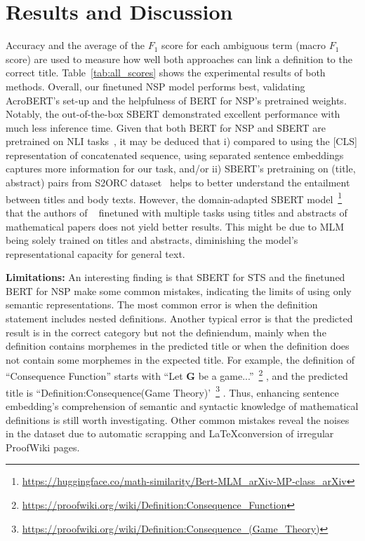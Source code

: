 \section{Results and Discussion}
\label{sec:experiments}
Accuracy and the average of the $F_1$ score for each ambiguous term (macro $F_1$ score) are used to measure how well both approaches can link a definition to the correct title. Table~\ref{tab:all_scores} shows the experimental results of both methods. Overall, our finetuned NSP model performs best, validating AcroBERT's set-up and the helpfulness of BERT for NSP's pretrained weights. Notably, the out-of-the-box SBERT demonstrated excellent performance with much less inference time.
Given that both BERT for NSP and SBERT are pretrained on NLI tasks~\cite{devlin2019bert,reimers2019sentence}, it may be deduced that i) compared to using the [CLS] representation of concatenated sequence, using separated sentence embeddings captures more information for our task, and/or ii) SBERT's pretraining on (title, abstract) pairs from S2ORC dataset~\cite{lo-wang-2020-s2orc} helps to better understand the entailment between titles and body texts. However, 
the domain-adapted SBERT model~\footnote{\url{https://huggingface.co/math-similarity/Bert-MLM_arXiv-MP-class_arXiv}}  that the authors of ~\cite{steinfeldt2024evaluation} finetuned with multiple tasks using titles and abstracts of mathematical papers does not yield better results. This might be due to MLM being solely trained on titles and abstracts, diminishing the model's representational capacity for general text. 

\textbf{Limitations:} An interesting finding %
is that SBERT for STS and the finetuned BERT for NSP make some common mistakes, indicating the limits of using only semantic representations. The most common error is when the definition statement includes nested definitions.  Another typical error is that the predicted result is in the correct category but not the definiendum, mainly when the definition contains morphemes in the predicted title or when the definition does not contain some morphemes in the expected title. For example, the definition of ``Consequence Function'' starts with ``Let $\mathbf{G}$ be a game...''~\footnote{\url{https://proofwiki.org/wiki/Definition:Consequence_Function}}
, and the predicted title is ``Definition:Consequence(Game Theory)'~\footnote{\url{https://proofwiki.org/wiki/Definition:Consequence_(Game_Theory)}}
. Thus, enhancing sentence embedding's comprehension of semantic and syntactic knowledge of mathematical definitions is still worth investigating. Other common mistakes reveal the noises in the dataset due to automatic scrapping and \LaTeX conversion of irregular ProofWiki pages.

